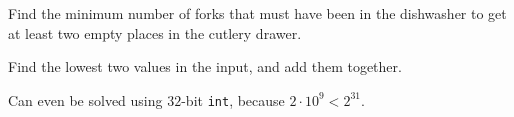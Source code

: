 \begin{frame}
    \frametitle{\problemtitle}
    \begin{description}
        \item<+->[Problem:] Find the minimum number of forks that must have been in the dishwasher
            to get at least two empty places in the cutlery drawer.
        \item<+->[Solution:] Find the lowest two values in the input, and add them together.
        \item<+->[Note:] Can even be solved using $32$-bit \texttt{int}, because $2\cdot10^9 < 2^{31}$.
    \end{description}
    \solvestats
\end{frame}
